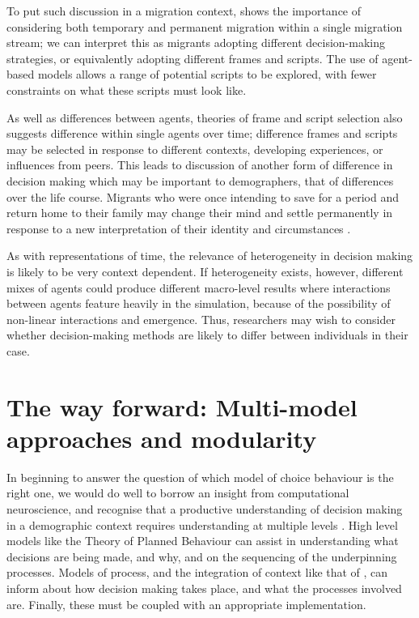 \documentclass{article}
\begin{document}
To put such discussion in a migration context, \cite{Bijwaard2008} shows the importance of considering both temporary and permanent migration within a single migration stream; we can interpret this as migrants adopting different decision-making strategies, or equivalently adopting different frames and scripts. The use of agent-based models allows a range of potential scripts to be explored, with fewer constraints on what these scripts must look like. 

As well as differences between agents, theories of frame and script selection also suggests difference within single agents over time; difference frames and scripts may be selected in response to different contexts, developing experiences, or influences from peers. This leads to discussion of another form of difference in decision making which may be important to demographers, that of differences over the life course. Migrants who were once intending to save for a period and return home to their family may change their mind and settle permanently in response to a new interpretation of their identity and circumstances \citep{Constant2002}.

As with representations of time, the relevance of heterogeneity in decision making is likely to be very context dependent. If heterogeneity exists, however, different mixes of agents could produce different macro-level results where interactions between agents feature heavily in the simulation, because of the possibility of non-linear interactions and emergence. Thus, researchers may wish to consider whether decision-making methods are likely to differ between individuals in their case.

\section{The way forward: Multi-model approaches and
modularity}\label{multi-model-approaches-and-modularity}

In beginning to answer the question of which model of choice behaviour is the right one, we would do well to borrow an insight from computational neuroscience, and recognise that a productive understanding of decision making in a demographic context requires understanding at multiple levels \citep{Marr1976,Marr1982}. High level models like the Theory of Planned Behaviour \citep{Ajzen1991} can assist in understanding what decisions are being made, and why, and on the sequencing of the underpinning processes. Models of process, and the integration of context like that of \citet{Ben-Akiva2012}, can inform about how decision making takes place, and what the processes involved are. Finally, these must be coupled with an appropriate implementation. 
\end{document}
